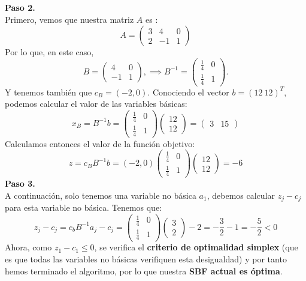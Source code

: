 \documentclass[11pt,table]{article}
\begin{document}
\begin{enumerate}
        \textbf{Paso 2.}\\
        Primero, vemos que nuestra matriz \(A\) es :
        \[
        A = \begin{pmatrix} 3 & 4 & 0 \\  2 & -1 & 1 \end{pmatrix}        
        \]
        Por lo que, en este caso, 
        \[
        B = \begin{pmatrix} 4 & 0 \\ -1 & 1\end{pmatrix}, \implies B^{-1} = \begin{pmatrix} \frac{1}{4} & 0 \\ \frac{1}{4} & 1\end{pmatrix}.
        \]
        Y tenemos también que \(c_B = (-2,0)\). Conociendo el vector \(b = (12 \ 12)^T\), podemos calcular el valor de las variables básicas:
        \[
        x_B = B^{-1} b = \begin{pmatrix} \frac{1}{4} & 0 \\ \frac{1}{4} & 1\end{pmatrix} \begin{pmatrix} 12 \\ 12 \end{pmatrix}  = \begin{pmatrix} 3 & 15\end{pmatrix}
        \]
        Calculamos entonces el valor de la función objetivo:
        \[
        z = c_B B^{-1} b = (-2,0)  \begin{pmatrix} \frac{1}{4} & 0 \\ \frac{1}{4} & 1\end{pmatrix} \begin{pmatrix} 12 \\ 12\end{pmatrix} = -6
        \]
        \textbf{Paso 3.}\\
        A continuación, solo tenemos una variable no básica \(a_1\), debemos calcular \(z_j - c_j\) para esta variable no básica. Tenemos que:
        \[
        z_j - c_j = c_b B^{-1}a_j - c_j =  \begin{pmatrix} \frac{1}{4} & 0 \\ \frac{1}{4} & 1\end{pmatrix}\begin{pmatrix} 3 \\ 2 \end{pmatrix} - 2 = -\frac{3}{2} - 1 = -\frac{5}{2} < 0
        \]
        Ahora, como \(z_1 - c_1 \leq 0\), se verifica el \textbf{criterio de optimalidad simplex} (que es que todas las variables no básicas verifiquen esta desigualdad) y por tanto hemos terminado el algoritmo, por lo que nuestra \textbf{SBF actual es óptima}. \\


\end{enumerate}
\end{document}

